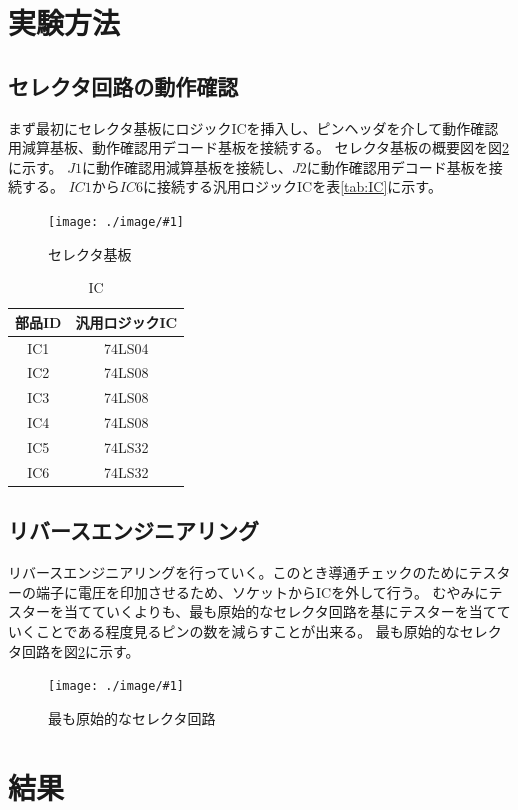 \documentclass[a4paper,11pt]{ltjsarticle}
\newcommand{\fig}[4]{
    \begin{figure}[htbp]
      \centering
      \texttt{[image: ./image/\#1]}
      \caption{#2}
      \label{fig:#3}
    \end{figure}
  }
\begin{document}
\section{実験方法}
\subsection{セレクタ回路の動作確認}
まず最初にセレクタ基板にロジックICを挿入し、ピンヘッダを介して動作確認用減算基板、動作確認用デコード基板を接続する。
セレクタ基板の概要図を図\ref{fig:selector}に示す。
$J1$に動作確認用減算基板を接続し、$J2$に動作確認用デコード基板を接続する。
$IC1$から$IC6$に接続する汎用ロジックICを表\ref{tab:IC}に示す。
\fig{kiban.drawio.png}{セレクタ基板}{selector}{0.6}
\begin{table}[htbp]
  \centering
  \caption{IC}
  \begin{tabular}{|c|c|}
    \hline
    部品ID  &  汎用ロジックIC  \\
    \hline
    IC1  &  74LS04  \\
    IC2  &  74LS08  \\
    IC3  &  74LS08  \\
    IC4  &  74LS08  \\
    IC5  &  74LS32  \\
    IC6  &  74LS32  \\
    \hline
  \end{tabular}
\end{table}
\newpage
\subsection{リバースエンジニアリング}
リバースエンジニアリングを行っていく。このとき導通チェックのためにテスターの端子に電圧を印加させるため、ソケットからICを外して行う。
むやみにテスターを当てていくよりも、最も原始的なセレクタ回路を基にテスターを当てていくことである程度見るピンの数を減らすことが出来る。
最も原始的なセレクタ回路を図\ref{fig:selector}に示す。
\fig{selector.png}{最も原始的なセレクタ回路}{selector}{1}
\section{結果}
\end{document}
